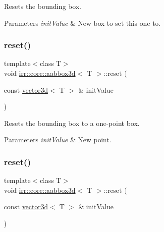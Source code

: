 Resets the bounding box. 


\begin{DoxyParams}{Parameters}
{\em init\+Value} & New box to set this one to. \\
\hline
\end{DoxyParams}
\mbox{\label{classirr_1_1core_1_1aabbox3d_af777a607745b2bd3f4390dfee8263944}} 
\subsubsection{\texorpdfstring{reset()}{reset()}\hspace{0.1cm}{\footnotesize\ttfamily [5/6]}}
{\footnotesize\ttfamily template$<$class T$>$ \\
void \hyperlink{classirr_1_1core_1_1aabbox3d}{irr\+::core\+::aabbox3d}$<$ T $>$\+::reset (\begin{DoxyParamCaption}\item[{const \hyperlink{classirr_1_1core_1_1vector3d}{vector3d}$<$ T $>$ \&}]{init\+Value }\end{DoxyParamCaption})\hspace{0.3cm}{\ttfamily [inline]}}



Resets the bounding box to a one-\/point box. 


\begin{DoxyParams}{Parameters}
{\em init\+Value} & New point. \\
\hline
\end{DoxyParams}
\mbox{\label{classirr_1_1core_1_1aabbox3d_af777a607745b2bd3f4390dfee8263944}} 
\subsubsection{\texorpdfstring{reset()}{reset()}\hspace{0.1cm}{\footnotesize\ttfamily [6/6]}}
{\footnotesize\ttfamily template$<$class T$>$ \\
void \hyperlink{classirr_1_1core_1_1aabbox3d}{irr\+::core\+::aabbox3d}$<$ T $>$\+::reset (\begin{DoxyParamCaption}\item[{const \hyperlink{classirr_1_1core_1_1vector3d}{vector3d}$<$ T $>$ \&}]{init\+Value }\end{DoxyParamCaption})\hspace{0.3cm}{\ttfamily [inline]}}



